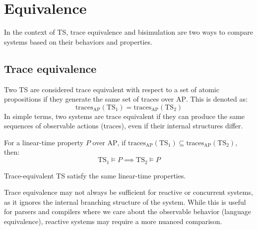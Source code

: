 \section{Equivalence}

In the context of TS, trace equivalence and bisimulation are two ways to compare systems based on their behaviors and properties.

\subsection{Trace equivalence}
Two TS are considered trace equivalent with respect to a set of atomic propositions if they generate the same set of traces over $\text{AP}$. 
This is denoted as:
\[\text{traces}_{\text{AP}}(\text{TS}_1)=\text{traces}_{\text{AP}}(\text{TS}_2)\]
\noindent In simple terms, two systems are trace equivalent if they can produce the same sequences of observable actions (traces), even if their internal structures differ.
\begin{theorem}
    For a linear-time property $P$ over $\text{AP}$, if $\text{traces}_{\text{AP}}(\text{TS}_1)\subseteq\text{traces}_{\text{AP}}(\text{TS}_2)$, then: 
    \[\text{TS}_1\models P \implies \text{TS}_2\models P\]
\end{theorem}
\begin{corollary}
    Trace-equivalent TS satisfy the same linear-time properties.
\end{corollary}
\noindent Trace equivalence may not always be sufficient for reactive or concurrent systems, as it ignores the internal branching structure of the system. 
While this is useful for parsers and compilers where we care about the observable behavior (language equivalence), reactive systems may require a more nuanced comparison.

